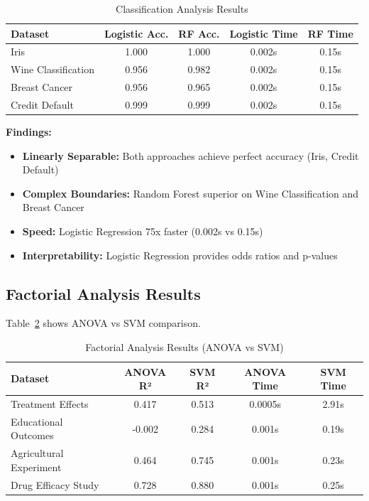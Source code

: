 \documentclass[11pt,a4paper]{article}
\begin{document}
\begin{table}[h]
\centering
\begin{tabular}{lcccc}
\toprule
\textbf{Dataset} & \textbf{Logistic Acc.} & \textbf{RF Acc.} & \textbf{Logistic Time} & \textbf{RF Time} \\
\midrule
Iris & \textcolor{accentcolor}{1.000} & \textcolor{accentcolor}{1.000} & 0.002s & 0.15s \\
Wine Classification & 0.956 & \textcolor{mlcolor}{0.982} & 0.002s & 0.15s \\
Breast Cancer & 0.956 & \textcolor{mlcolor}{0.965} & 0.002s & 0.15s \\
Credit Default & \textcolor{accentcolor}{0.999} & \textcolor{accentcolor}{0.999} & 0.002s & 0.15s \\
\bottomrule
\end{tabular}
\caption{Classification Analysis Results}
\label{tab:classification_results}
\end{table}

\textbf{Findings:}
\begin{itemize}
    \item \textbf{Linearly Separable:} Both approaches achieve perfect accuracy (Iris, Credit Default)
    \item \textbf{Complex Boundaries:} Random Forest superior on Wine Classification and Breast Cancer
    \item \textbf{Speed:} Logistic Regression 75x faster (0.002s vs 0.15s)
    \item \textbf{Interpretability:} Logistic Regression provides odds ratios and p-values
\end{itemize}

\subsection{Factorial Analysis Results}

Table~\ref{tab:factorial_results} shows ANOVA vs SVM comparison.

\begin{table}[h]
\centering
\begin{tabular}{lcccc}
\toprule
\textbf{Dataset} & \textbf{ANOVA R²} & \textbf{SVM R²} & \textbf{ANOVA Time} & \textbf{SVM Time} \\
\midrule
Treatment Effects & 0.417 & \textcolor{mlcolor}{0.513} & 0.0005s & 2.91s \\
Educational Outcomes & -0.002 & \textcolor{mlcolor}{0.284} & 0.001s & 0.19s \\
Agricultural Experiment & 0.464 & \textcolor{mlcolor}{0.745} & 0.001s & 0.23s \\
Drug Efficacy Study & 0.728 & \textcolor{mlcolor}{0.880} & 0.001s & 0.25s \\
\bottomrule
\end{tabular}
\caption{Factorial Analysis Results (ANOVA vs SVM)}
\label{tab:factorial_results}
\end{table}
\end{document}

